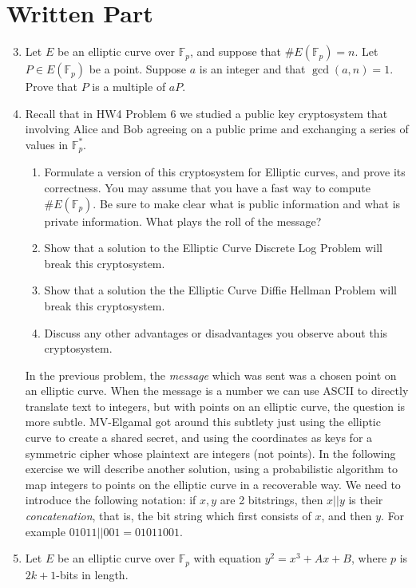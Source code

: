 \documentclass[11pt]{article}
\newcommand{\bF}{\mathbb{F}}
\begin{document}
\section*{Written Part}
\begin{enumerate}
  \setcounter{enumi}{2}
  \item{
  Let $E$ be an elliptic curve over $\bF_p$, and suppose that $\#E(\bF_p) = n$.  Let $P\in E(\bF_p)$ be a point.  Suppose $a$ is an integer and that $\gcd(a,n)=1$.  Prove that $P$ is a multiple of $aP$.
  }
  \newpage
  \item{
  Recall that in HW4 Problem 6 we studied a public key cryptosystem that involving Alice and Bob agreeing on a public prime and exchanging a series of values in $\bF_p^*$.
  \begin{enumerate}
    \item{
    Formulate a version of this cryptosystem for Elliptic curves, and prove its correctness.  You may assume that you have a fast way to compute $\#E(\bF_p)$. Be sure to make clear what is public information and what is private information.  What plays the roll of the message?
    }
    \item{
    Show that a solution to the Elliptic Curve Discrete Log Problem will break this cryptosystem.
    }
    \item{
    Show that a solution the the Elliptic Curve Diffie Hellman Problem will break this cryptosystem.
    }
    \item{
    Discuss any other advantages or disadvantages you observe about this cryptosystem.
    }
  \end{enumerate}
  }
  In the previous problem, the \textit{message} which was sent was a chosen point on an elliptic curve.  When the message is a number we can use ASCII to directly translate text to integers, but with points on an elliptic curve, the question is more subtle.  MV-Elgamal got around this subtlety just using the elliptic curve to create a shared secret, and using the coordinates as keys for a symmetric cipher whose plaintext are integers (not points).  In the following exercise we will describe another solution, using a probabilistic algorithm to map integers to points on the elliptic curve in a recoverable way.  We need to introduce the following notation: if $x,y$ are 2 bitstrings, then $x||y$ is their \textit{concatenation}, that is, the bit string which first consists of $x$, and then $y$.  For example $01011||001 = 01011001$.
  \item{
  Let $E$ be an elliptic curve over $\bF_p$ with equation $y^2 = x^3 + Ax + B$, where $p$ is $2k+1$-bits in length.
}
\end{enumerate}
\end{document}
